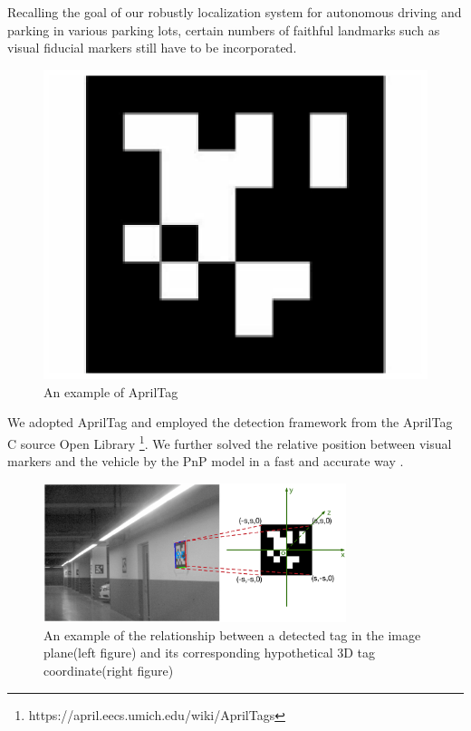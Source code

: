 \documentclass[journal]{IEEEtran}
\newcommand{\COMMENT}[1]{\textcolor{red}{#1}}
\begin{document}
Recalling the goal of our robustly localization system for autonomous driving and parking in various parking lots, certain numbers of faithful landmarks such as visual fiducial markers still have to be incorporated.

\begin{figure}
\centering
\includegraphics{pic/fig6_Visual_markers}
\caption{An example of AprilTag}\label{fig:6}
\end{figure}

We adopted AprilTag and employed the detection framework from the AprilTag C source Open Library \footnote{https://april.eecs.umich.edu/wiki/AprilTags}\cite{Olson2011AprilTag}.
We further solved the relative position between visual markers and the vehicle by the PnP model in a fast and accurate way \cite{Hartley2003Multiple}. 


\begin{figure}
\centering
\includegraphics[height = 1.6in]{pic/fig7_Visual_markers}
\caption{
An example of the relationship between a detected tag in the image plane(left figure) and its corresponding hypothetical 3D tag coordinate(right figure)
}\label{fig:7}
\end{figure}
\end{document}
